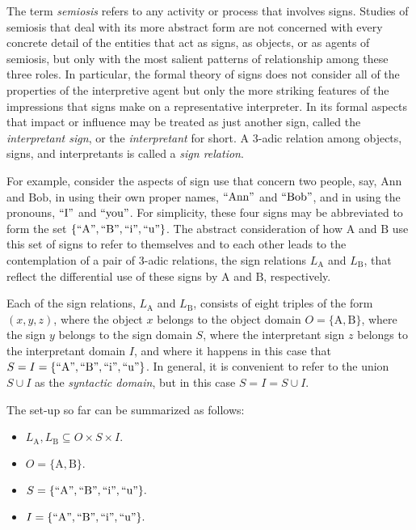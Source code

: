 \documentclass[12pt]{article}
\begin{document}
The term \textit{semiosis} refers to any activity or process that involves signs.  Studies of semiosis that deal with its more abstract form are not concerned with every concrete detail of the entities that act as signs, as objects, or as agents of semiosis, but only with the most salient patterns of relationship among these three roles.  In particular, the formal theory of signs does not consider all of the properties of the interpretive agent but only the more striking features of the impressions that signs make on a representative interpreter.  In its formal aspects that impact or influence may be treated as just another sign, called the \textit{interpretant sign}, or the \textit{interpretant} for short.  A 3-adic relation among objects, signs, and interpretants is called a \textit{sign relation}.

For example, consider the aspects of sign use that concern two people, say, $\mathrm{Ann}$ and $\mathrm{Bob}$, in using their own proper names, $\mathrm{``Ann"}$ and $\mathrm{``Bob"}$, and in using the pronouns, $\mathrm{``I"}$ and $\mathrm{``you"}$.  For simplicity, these four signs may be abbreviated to form the set $\{ \mathrm{``A"}, \mathrm{``B"}, \mathrm{``i"}, \mathrm{``u"} \}$.  The abstract consideration of how $\mathrm{A}$ and $\mathrm{B}$ use this set of signs to refer to themselves and to each other leads to the contemplation of a pair of 3-adic relations, the sign relations $L_{\mathrm{A}}$ and $L_{\mathrm{B}}$, that reflect the differential use of these signs by $\mathrm{A}$ and $\mathrm{B}$, respectively.

Each of the sign relations, $L_{\mathrm{A}}$ and $L_{\mathrm{B}}$, consists of eight triples of the form $(x, y, z)$, where the object $x$ belongs to the object domain $O = \{ \mathrm{A}, \mathrm{B} \}$, where the sign $y$ belongs to the sign domain $S$, where the interpretant sign $z$ belongs to the interpretant domain $I$, and where it happens in this case that $S = I = \{ \mathrm{``A"}, \mathrm{``B"}, \mathrm{``i"}, \mathrm{``u"} \}$.  In general, it is convenient to refer to the union $S \cup I$ as the \textit{syntactic domain}, but in this case $S = I = S \cup I$.

The set-up so far can be summarized as follows:

\begin{itemize}
\item
$L_{\mathrm{A}}, L_{\mathrm{B}} \subseteq O \times S \times I.$
\item
$O = \{ \mathrm{A}, \mathrm{B} \}.$
\item
$S = \{ \mathrm{``A"}, \mathrm{``B"}, \mathrm{``i"}, \mathrm{``u"} \}.$
\item
$I = \{ \mathrm{``A"}, \mathrm{``B"}, \mathrm{``i"}, \mathrm{``u"} \}.$
\end{itemize}
\end{document}
